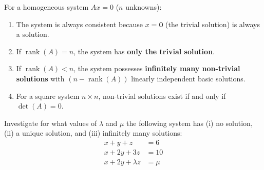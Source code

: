\begin{theorem}[Homogeneous Linear Systems $Ax = 0$]
For a homogeneous system $Ax = 0$ ($n$ unknowns):
\begin{enumerate}[leftmargin=1.5em]
    \item The system is always consistent because $x = \mathbf{0}$ (the trivial solution) is always a solution.
    \item If $\operatorname{rank}(A) = n$, the system has \textbf{only the trivial solution}.
    \item If $\operatorname{rank}(A) < n$, the system possesses \textbf{infinitely many non-trivial solutions} with $(n - \operatorname{rank}(A))$ linearly independent basic solutions.
    \item For a square system $n \times n$, non-trivial solutions exist if and only if $\det(A) = 0$.
\end{enumerate}
\end{theorem}

\begin{example}
Investigate for what values of $\lambda$ and $\mu$ the following system has (i) no solution, (ii) a unique solution, and (iii) infinitely many solutions:
\begin{align}
x + y + z &= 6 \\
x + 2y + 3z &= 10 \\
x + 2y + \lambda z &= \mu
\end{align}
\end{example}

